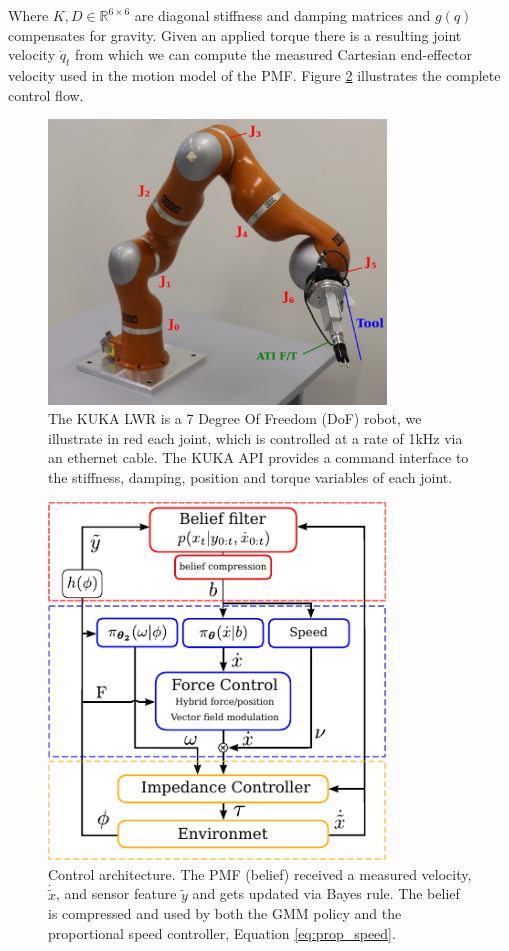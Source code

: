 Where $K,D \in \mathbb{R}^{6\times6}$ are diagonal stiffness and damping matrices and $g(q)$ compensates for gravity. Given an applied torque there is 
a resulting joint velocity $\dot{q}_t$ from which we can compute the measured Cartesian end-effector velocity used in the motion model of the PMF.
Figure \ref{fig:control_flow} illustrates the complete control flow.

\begin{figure}
 \centering
 \includegraphics[width=0.8\textwidth]{./ch4-PiH/Figures/kuka.pdf}
 \caption{The KUKA LWR is a 7 Degree Of Freedom (DoF) robot, we illustrate in red each joint, which is controlled at a rate of 1kHz via an ethernet cable. The KUKA API provides a command interface to the 
 stiffness, damping, position and torque variables of each joint.}
 \label{fig:kuka}
\end{figure}

\begin{figure}
  \centering
  \includegraphics[width=0.8\textwidth]{./ch4-PiH/Figures/control_flow_final.pdf}
  \caption{Control architecture. The PMF (belief) received a measured velocity, $\dot{\tilde{x}}$, and sensor feature $\tilde{y}$ and gets updated 
  via Bayes rule. The belief is compressed and used by both the GMM policy and the proportional speed controller, Equation \ref{eq:prop_speed}.}
  \label{fig:control_flow}
\end{figure}


